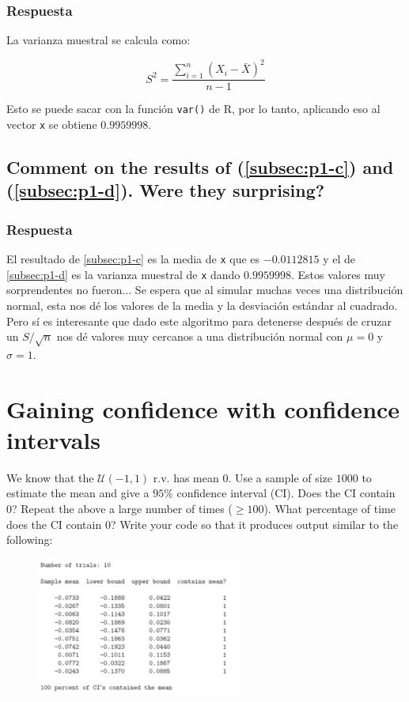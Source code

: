 \documentclass[12pt]{article}\usepackage[]{graphicx}\usepackage[]{xcolor}
\begin{document}
\subsubsection{Respuesta}

La varianza muestral se calcula como:

\[
S^{2} = \frac{\sum_{i=1}^{n} (X_{i} - \bar{X})^{2}}{n-1}
\]

Esto se puede sacar con la función \lstinline|var()| de \textsf{R}, por lo tanto, aplicando eso al vector \lstinline|x| se obtiene $0.9959998$.



\subsection{Comment on the results of (\ref{subsec:p1-c}) and (\ref{subsec:p1-d}). Were they surprising?}
\label{subsec:p1-e}

\subsubsection{Respuesta}

El resultado de \ref{subsec:p1-c} es la media de \lstinline|x| que es $-0.0112815$ y el de \ref{subsec:p1-d} es la varianza muestral de \lstinline|x| dando $0.9959998$. Estos valores muy sorprendentes no fueron... Se espera que al simular muchas veces una distribución normal, esta nos dé los valores de la media y la desviación estándar al cuadrado. Pero sí es interesante que dado este algoritmo para detenerse después de cruzar un $S / \sqrt{n}$ nos dé valores muy cercanos a una distribución normal con $\mu = 0$ y $\sigma = 1$.


\newpage

\section{Gaining confidence with confidence intervals}

We know that the $\mathcal{U}(-1, 1)$ r.v. has mean 0. Use a sample of size $1000$ to estimate the mean and give a $95\%$ confidence interval (CI). Does the CI contain 0? Repeat the above a large number of times ($\geq  100$). What percentage of time does the CI contain 0? Write your code so that it produces output similar to the following:

\begin{figure}[ht]
  \centering
  \includegraphics[width=0.6\textwidth]{img/Punto2.png}
\end{figure}
\end{document}
